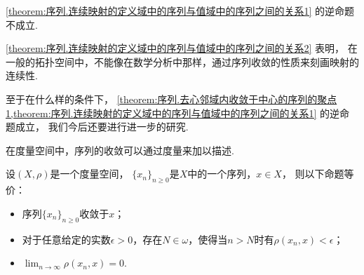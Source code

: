 \begin{proposition}\label{theorem:序列.连续映射的定义域中的序列与值域中的序列之间的关系2}
\cref{theorem:序列.连续映射的定义域中的序列与值域中的序列之间的关系1} 的逆命题不成立.
\end{proposition}

\cref{theorem:序列.连续映射的定义域中的序列与值域中的序列之间的关系2} 表明，
在一般的拓扑空间中，不能像在数学分析中那样，通过序列收敛的性质来刻画映射的连续性.

至于在什么样的条件下，
\cref{theorem:序列.去心邻域内收敛于中心的序列的聚点1,theorem:序列.连续映射的定义域中的序列与值域中的序列之间的关系1} 的逆命题成立，
我们今后还要进行进一步的研究.

在度量空间中，序列的收敛可以通过度量来加以描述.
\begin{theorem}\label{theorem:序列.度量空间中的收敛序列}
设\((X,\rho)\)是一个度量空间，
\(\{x_n\}_{n\geq0}\)是\(X\)中的一个序列，\(x \in X\)，
则以下命题等价：\begin{itemize}
	\item 序列\(\{x_n\}_{n\geq0}\)收敛于\(x\)；
	\item 对于任意给定的实数\(\epsilon>0\)，存在\(N\in\omega\)，使得当\(n>N\)时有\(\rho(x_n,x)<\epsilon\)；
	\item \(\lim_{n\to\infty} \rho(x_n,x) = 0\).
\end{itemize}
\end{theorem}


